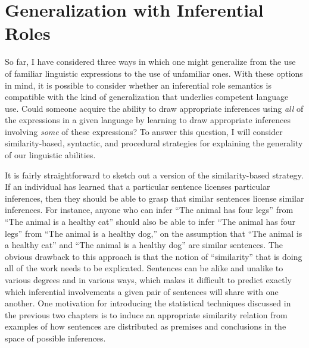 \section{Generalization with Inferential Roles}

So far, I have considered three ways in which one might generalize from the use of familiar linguistic expressions to the use of unfamiliar ones. With these options in mind, it is possible to consider whether an inferential role semantics is compatible with the kind of generalization that underlies competent language use. Could someone acquire the ability to draw appropriate inferences using \textit{all} of the expressions in a given language by learning to draw appropriate inferences involving \textit{some} of these expressions? To answer this question, I will consider similarity-based, syntactic, and procedural strategies for explaining the generality of our linguistic abilities.

It is fairly straightforward to sketch out a version of the similarity-based strategy. If an individual has learned that a particular sentence licenses particular inferences, then they should be able to grasp that similar sentences license similar inferences. For instance, anyone who can infer ``The animal has four legs'' from ``The animal is a healthy cat'' should also be able to infer ``The animal has four legs'' from ``The animal is a healthy dog,'' on the assumption that ``The animal is a healthy cat'' and ``The animal is a healthy dog'' are similar sentences. The obvious drawback to this approach is that the notion of ``similarity'' that is doing all of the work needs to be explicated. Sentences can be alike and unalike to various degrees and in various ways, which makes it difficult to predict exactly which inferential involvements a given pair of sentences will share with one another. One motivation for introducing the statistical techniques discussed in the previous two chapters is to induce an appropriate similarity relation from examples of how sentences are distributed as premises and conclusions in the space of possible inferences.

